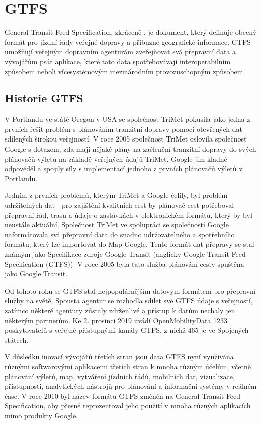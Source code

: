 \chapter{GTFS}
\label{2-teorie-gtfs}

General Transit Feed Specification, zkráceně , je dokument, který definuje
obecný formát pro jízdní řády veřejné dopravy a příbuzné geografické informace.
GTFS  umožňují veřejným dopravním agenturám zveřejňovat svá přepravní
data a vývojářům psát aplikace, které tato data spotřebovávají interoperabilním
způsobem neboli vícesystémovým mezinárodním provozuschopným způsobem. \cite{gtfs-info}

\section{Historie GTFS}
V Portlandu ve státě Oregon v USA se společnost TriMet pokusila jako jedna z prvních 
řešit problém s plánováním tranzitní dopravy pomocí otevřených dat sdílených širokou veřejností.
V roce 2005 společnost TriMet oslovila společnost Google s dotazem, zda mají nějaké plány
na začlenění tranzitní dopravy do svých plánovačů výletů na základě veřejných údajů TriMet.
Google jim kladně odpověděl a spojily síly s implementací jednoho z prvních plánovačů výletů v Portlandu.

Jedním z prvních problémů, kterým TriMet a Google čelily, byl problém udržitelných dat
- pro zajištění kvalitních cest by plánovač cest potřeboval přepravní řád, 
trasu a údaje o zastávkách v elektronickém formátu, který by byl neustále aktuální. 
Společnost TriMet ve spolupráci se společností Google naformátovala svá přepravní 
data do snadno udržovatelného a spotřebního formátu, který lze importovat do Map Google. 
Tento formát dat přepravy se stal známým jako Specifikace zdroje Google Transit (anglicky
Google Transit Feed Specification (GTFS)). 
V roce 2005 byla tato služba plánování cesty spuštěna jako Google Transit.

Od tohoto roku se GTFS stal nejpopulárnějším datovým formátem pro přepravní služby na světě. 
Spousta agentur se rozhodla sdílet své GTFS údaje s veřejností, zatímco některé agentury 
zůstaly zdrženlivé a přístup k datům nechaly jen některým partnerům. Ke 2. prosinci 2019
uvádí OpenMobilityData 1233 poskytovatelů s veřejně přístupnými kanály GTFS,
z nichž 465 je ve Spojených státech. 

V důsledku inovací vývojářů třetích stran jsou data GTFS nyní využívána různými softwarovými aplikacemi
třetích stran k mnoha různým účelům, včetně plánování výletů, map, vytváření jízdních řádů, mobilních dat,
vizualizace, přístupnosti, analytických nástrojů pro plánování a informační systémy v reálném čase.
V roce 2010 byl název formátu GTFS změněn na General Transit Feed Specification,
aby přesně reprezentoval jeho použití v mnoha různých aplikacích mimo produkty Google. \cite{transitwiki} 
 
